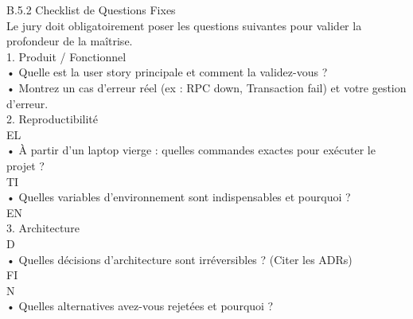 \documentclass[12pt,landscape,a4paper]{article}
\begin{document}
B.5.2 Checklist de Questions Fixes\\
Le jury doit obligatoirement poser les questions suivantes pour valider la profondeur de la maîtrise.\\
\vspace{0.5em}
1. Produit / Fonctionnel\\
\vspace{0.5em}
• Quelle est la user story principale et comment la validez-vous ?\\
\vspace{0.5em}
• Montrez un cas d’erreur réel (ex : RPC down, Transaction fail) et votre gestion d’erreur.\\
\vspace{0.5em}
2. Reproductibilité\\
\vspace{0.5em}
\vspace{0.5em}
\vspace{0.5em}
\vspace{0.5em}
EL\\
• À partir d’un laptop vierge : quelles commandes exactes pour exécuter le projet ?\\
\vspace{0.5em}
\vspace{0.5em}
\vspace{0.5em}
\vspace{0.5em}
TI\\
• Quelles variables d’environnement sont indispensables et pourquoi ?\\
\vspace{0.5em}
\vspace{0.5em}
\vspace{0.5em}
\vspace{0.5em}
EN\\
3. Architecture\\
\vspace{0.5em}
\vspace{0.5em}
\vspace{0.5em}
\vspace{0.5em}
D\\
• Quelles décisions d’architecture sont irréversibles ? (Citer les ADRs)\\
\vspace{0.5em}
\vspace{0.5em}
\vspace{0.5em}
\vspace{0.5em}
FI\\
N\\
• Quelles alternatives avez-vous rejetées et pourquoi ?\\
\end{document}

